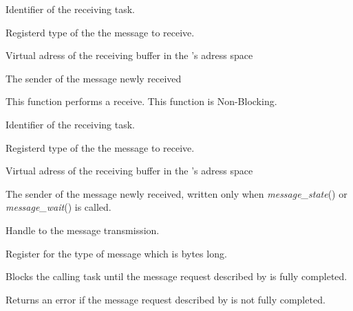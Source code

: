 \begin{itemize}
{	   \item {}

	     Identifier of the receiving task.

	   \item {}

	     Registerd type of the the message to receive.

	   \item {}

	     Virtual adress of the receiving buffer in the
	     's adress space

	   \item {}

	     The sender of the message newly received
	 }

	 {
	   This function performs a receive. This function is Non-Blocking.
	     
	   \item {}
	     
	     Identifier of the receiving task.

	   \item {}
	     
	     Registerd type of the the message to receive.

	   \item {}
	     
	     Virtual adress of the receiving buffer in the
	     's adress space
	  
	   \item {}
	     
	     The sender of the message newly received, written only when
	     \textit{message\_state}() or \textit{message\_wait}() is
	     called.

	   \item {}
	     
	     Handle to the message transmission.
	 }

	 {
	   Register for  the type of message
	    which is  bytes long.
	 }

	 {
	   Blocks the calling task until the message request described by
	    is fully completed.
	 }


	 {
	   Returns an error if the message request described by
	    is not fully completed.
	 }

\end{itemize}


